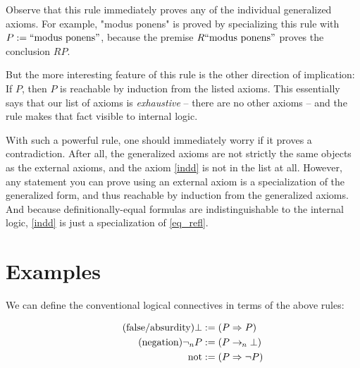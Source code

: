 \documentclass{article}
\begin{document}
  Observe that this rule immediately proves any of the individual generalized axioms. For example, "modus ponens" is proved by specializing this rule with $P := \mathrm{``modus\ ponens"}$, because the premise $R\mathrm{``modus\ ponens"}$ proves the conclusion $RP$.
  
  But the more interesting feature of this rule is the other direction of implication: If $P$, then $P$ is reachable by induction from the listed axioms. This essentially says that our list of axioms is \emph{exhaustive} – there are no other axioms – and the rule makes that fact visible to internal logic.
  
With such a powerful rule, one should immediately worry if it proves a contradiction. After all, the generalized axioms are not strictly the same objects as the external axioms, and the axiom \eqref{indd} is not in the list at all. However, any statement you can prove using an external axiom is a specialization of the generalized form, and thus reachable by induction from the generalized axioms. And because definitionally-equal formulas are indistinguishable to the internal logic, \eqref{indd} is just a specialization of \eqref{eq_refl}.

  \section{Examples}\label{structure}

  We can define the conventional logical connectives in terms of the above rules:

  \setlength{\jot}{0.4em}
  \begin{align*}
    \tag{false/absurdity}
    \bot &:= (P \Rightarrow{P})\\
    \tag{negation}
    \neg_{n} P &:= ({P \rightarrow_{\hspace{-0.04em}n} \bot})\\
    \mathrm{not} &:= (P \Rightarrow \neg P)\\
  \end{align*}
\end{document}
